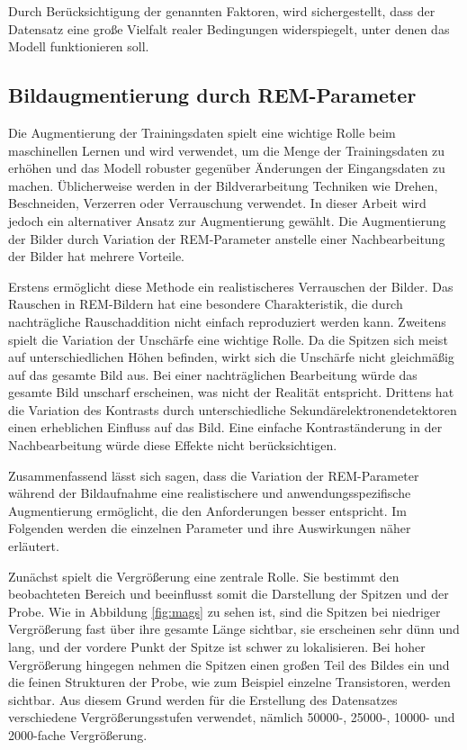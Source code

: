 Durch Berücksichtigung der genannten Faktoren, wird sichergestellt, dass der Datensatz eine große Vielfalt realer Bedingungen widerspiegelt, unter denen das Modell funktionieren soll.

\subsection{Bildaugmentierung durch REM-Parameter}
\label{sec:bildaugpar}
Die Augmentierung der Trainingsdaten spielt eine wichtige Rolle beim maschinellen Lernen und wird verwendet, um die Menge der Trainingsdaten zu erhöhen und das Modell robuster gegenüber Änderungen der Eingangsdaten zu machen. Üblicherweise werden in der Bildverarbeitung Techniken wie Drehen, Beschneiden, Verzerren oder Verrauschung verwendet. In dieser Arbeit wird jedoch ein alternativer Ansatz zur Augmentierung gewählt.
Die Augmentierung der Bilder durch Variation der REM-Parameter anstelle einer Nachbearbeitung der Bilder hat mehrere Vorteile.

Erstens ermöglicht diese Methode ein realistischeres Verrauschen der Bilder. Das Rauschen in REM-Bildern hat eine besondere Charakteristik, die durch nachträgliche Rauschaddition nicht einfach reproduziert werden kann.
Zweitens spielt die Variation der Unschärfe eine wichtige Rolle. Da die Spitzen sich meist auf unterschiedlichen Höhen befinden, wirkt sich die Unschärfe nicht gleichmäßig auf das gesamte Bild aus. Bei einer nachträglichen Bearbeitung würde das gesamte Bild unscharf erscheinen, was nicht der Realität entspricht.
Drittens hat die Variation des Kontrasts durch unterschiedliche Sekundärelektronendetektoren einen erheblichen Einfluss auf das Bild. Eine einfache Kontraständerung in der Nachbearbeitung würde diese Effekte nicht berücksichtigen.

Zusammenfassend lässt sich sagen, dass die Variation der REM-Parameter während der Bildaufnahme eine realistischere und anwendungsspezifische Augmentierung ermöglicht, die den Anforderungen besser entspricht. Im Folgenden werden die einzelnen Parameter und ihre Auswirkungen näher erläutert.

Zunächst spielt die Vergrößerung eine zentrale Rolle. Sie bestimmt den beobachteten Bereich und beeinflusst somit die Darstellung der Spitzen und der Probe. Wie in Abbildung \ref{fig:mags} zu sehen ist, sind die Spitzen bei niedriger Vergrößerung fast über ihre gesamte Länge sichtbar, sie erscheinen sehr dünn und lang, und der vordere Punkt der Spitze ist schwer zu lokalisieren. Bei hoher Vergrößerung hingegen nehmen die Spitzen einen großen Teil des Bildes ein und die feinen Strukturen der Probe, wie zum Beispiel einzelne Transistoren, werden sichtbar. Aus diesem Grund werden für die Erstellung des Datensatzes verschiedene Vergrößerungsstufen verwendet, nämlich 50000-, 25000-, 10000- und 2000-fache Vergrößerung.

